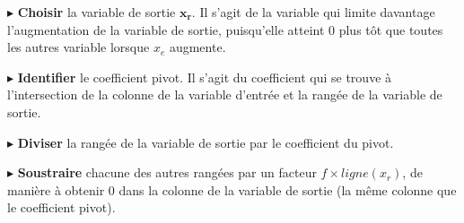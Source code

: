 \documentclass{report}
\begin{document}
\begin{multicols*}{2}
    \noindent
    $\blacktriangleright$ 
    \textbf{Choisir} la variable de sortie 
    $\boldsymbol{x_r}$. Il s'agit de la variable 
    qui limite davantage l'augmentation de la variable de sortie, 
    puisqu'elle atteint 0 plus tôt que toutes les autres variable 
    lorsque $x_e$ augmente. 

    \noindent
    $\blacktriangleright$ 
    \textbf{Identifier} le coefficient pivot. Il s'agit du 
    coefficient qui se trouve à l'intersection de la colonne de 
    la variable d'entrée et la rangée de la variable de sortie. 


    \noindent
    $\blacktriangleright$ 
    \textbf{Diviser} la rangée de la variable de sortie par 
    le coefficient du pivot.


    \noindent
    $\blacktriangleright$ 
    \textbf{Soustraire} chacune des autres rangées par un facteur 
    $f \times ligne(x_r)$, de manière à obtenir 0 dans la colonne 
    de la variable de sortie (la même colonne que le coefficient pivot). 
\end{multicols*} 
\end{document}
